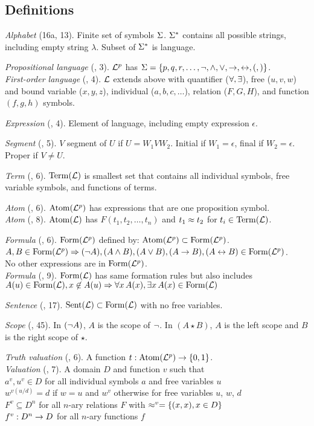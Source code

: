 \documentclass[class=cs245,nogeometry]{agony}
\newcommand{\dfn}[3]{\textit{#1} (\textsection #2, #3).}
\begin{document}
\begin{multicols}{2}
  \section*{Definitions}

  \dfn{Alphabet}{16a}{13} Finite set of symbols $\S$.
  $\S^*$ contains all possible strings, including empty string $\lambda$.
  Subset of $\S^*$ is language.

  \dfn{Propositional language}{02}{3}
  $\Lp$ has $\S = \{p,q,r,\ldots,\n,\a,\o,\i,\e,(,)\}$. \\
  \dfn{First-order language}{11}{4}
  $\L$ extends above with quantifier ($\A,\X$),
  free ($u,v,w$) and bound variable ($x,y,z$), individual ($a,b,c,\dotsc$),
  relation ($F,G,H$), and function $(f,g,h)$ symbols.

  \dfn{Expression}{02}{4} Element of language, including empty expression $\epsilon$.

  \dfn{Segment}{02}{5} $V$ segment of $U$ if $U = W_1VW_2$.
  Initial if $W_1 = \epsilon$, final if $W_2 = \epsilon$.
  Proper if $V \neq U$.

  \dfn{Term}{11}{6} $\Term(\L)$ is smallest set that contains
  all individual symbols, free variable symbols, and functions of terms.

  \dfn{Atom}{02}{6} $\Atom(\Lp)$ has expressions that are one proposition symbol. \\
  \dfn{Atom}{11}{8} $\Atom(\L)$ has $F(t_1,t_2,\dotsc,t_n)$ and $t_1 \eq t_2$ for $t_i \in \Term(\L)$.

  \dfn{Formula}{02}{6}
  $\Form(\Lp)$ defined by: $\Atom(\Lp) \subset \Form(\Lp)$. \\
  $A,B\in\Form(\Lp) \Rarr (\n A), (A \a B), (A \o B), (A \i B), (A \e B) \in \Form(\Lp)$. \\
  No other expressions are in $\Form(\Lp)$. \\
  \dfn{Formula}{11}{9} $\Form(\L)$ has same formation rules but also includes
  $A(u)\in\Form(\L), x\not\in A(u) \Rarr \A[x]A(x), \X[x]A(x) \in \Form(\L)$

  \dfn{Sentence}{11}{17} $\Sent(\L) \subset \Form(\L)$ with no free variables.

  \dfn{Scope}{02}{45}
  In $(\n A)$, $A$ is the scope of $\n$.
  In $(A \star B)$, $A$ is the left scope and $B$ is the right scope of $\star$.

  \dfn{Truth valuation}{03}{6} A function $t : \Atom(\Lp)\i\{0,1\}$. \\
  \dfn{Valuation}{12}{7} A domain $D$ and function $v$ such that \\
  $a^v, u^v \in D$ for all individual symbols $a$ and free variables $u$ \\
  $w^{v(u/d)} = d$ if $w = u$ and $w^v$ otherwise for free variables $u$, $w$, $d$ \\
  $F^v \subseteq D^n$ for all $n$-ary relations $F$ with $\eq^v = \{(x,x),x\in D\}$ \\
  $f^v : D^n \i D$ for all $n$-ary functions $f$


\end{multicols}
\end{document}
